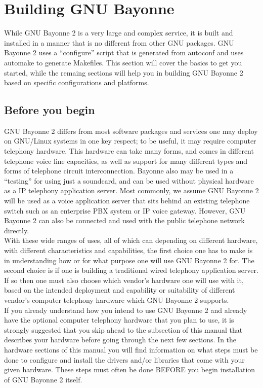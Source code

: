 \documentclass[a4paper,12pt]{article}
\begin{document}
\section{Building GNU Bayonne}

While GNU Bayonne 2 is a very large and complex service, it is built and
installed in a manner that is no different from other GNU packages.  GNU
Bayonne 2 uses a ``configure'' script that is generated from autoconf
and uses automake to generate Makefiles.  This section will cover the
basics to get you started, while the remaing sections will help you in
building GNU Bayonne 2 based on specific configurations and platforms. \\

\subsection{Before you begin}

GNU Bayonne 2 differs from most software packages and services one may
deploy on GNU/Linux systems in one key respect; to be useful, it may
require computer telephony hardware.  This hardware can take many forms,
and comes in different telephone voice line capacities, as well as
support for many different types and forms of telephone circuit
interconnection. Bayonne also may be used in a ``testing'' for using
just a soundcard, and can be used without physical hardware as a IP
telephony application server.  Most commonly, we assume GNU Bayonne 2
will be used as a voice application server that sits behind an existing
telephone switch such as an enterprise PBX system or IP voice gateway. 
However, GNU Bayonne 2 can also be connected and used with the public
telephone network directly. \\

With these wide ranges of uses, all of which can depending on different
hardware, with different characteristics and capabilities, the first
choice one has to make is in understanding how or for what purpose one
will use GNU Bayonne 2 for.  The second choice is if one is building a
traditional wired telephony application server.  If so then one must
also choose which vendor's hardware one will use with it, based on the
intended deployment and capability or suitability of different vendor's
computer telephony hardware which GNU Bayonne 2 supports. \\

If you already understand how you intend to use GNU Bayonne 2 and already
have the optional computer telephony hardware that you plan to use, it is
strongly suggested that you skip ahead to the subsection of this manual that
describes your hardware before going through the next few sections.  In
the hardware sections of this manual you will find information on what
steps must be done to configure and install the drivers and/or libraries
that come with your given hardware.  These steps must often be done BEFORE
you begin installation of GNU Bayonne 2 itself.  \\
\end{document}
